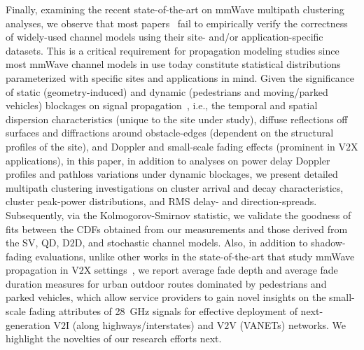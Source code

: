 \documentclass[12pt, draftcls, onecolumn]{IEEEtran}
\begin{document}
Finally, examining the recent state-of-the-art on mmWave multipath clustering analyses, we observe that most papers~\cite{Outdoor28G, PDAPs, D2DHumanBlockage, DopplerHST, V2XBlockages, MacCartneyUrbanHumanBlockage} fail to empirically verify the correctness of widely-used channel models using their site- and/or application-specific datasets. This is a critical requirement for propagation modeling studies since most mmWave channel models in use today constitute statistical distributions parameterized with specific sites and applications in mind. Given the significance of static (geometry-induced) and dynamic (pedestrians and moving/parked vehicles) blockages on signal propagation~\cite{Rappaport}, i.e., the temporal and spatial dispersion characteristics (unique to the site under study), diffuse reflections off surfaces and diffractions around obstacle-edges (dependent on the structural profiles of the site), and Doppler and small-scale fading effects (prominent in V$2$X applications), in this paper, in addition to analyses on power delay Doppler profiles and pathloss variations under dynamic blockages, we present detailed multipath clustering investigations on cluster arrival and decay characteristics, cluster peak-power distributions, and RMS delay- and direction-spreads. Subsequently, via the Kolmogorov-Smirnov statistic, we validate the goodness of fits between the CDFs obtained from our measurements and those derived from the SV, QD, D$2$D, and stochastic channel models. Also, in addition to shadow-fading evaluations, unlike other works in the state-of-the-art that study mmWave propagation in V$2$X settings~\cite{DopplerHST, V2XBlockages, MacCartneyUrbanHumanBlockage}, we report average fade depth and average fade duration measures for urban outdoor routes dominated by pedestrians and parked vehicles, which allow service providers to gain novel insights on the small-scale fading attributes of \SI{28}{\giga\hertz} signals for effective deployment of next-generation V$2$I (along highways/interstates) and V$2$V (VANETs) networks. We highlight the novelties of our research efforts next.
\end{document}
